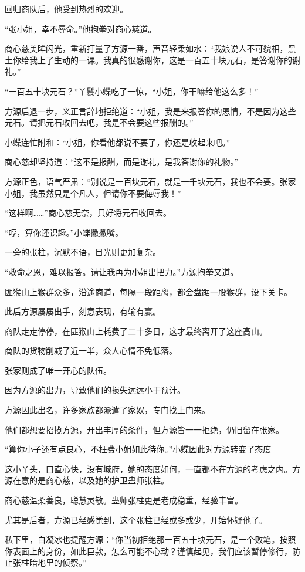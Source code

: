 \begin{this_body}
回归商队后，他受到热烈的欢迎。

“张小姐，幸不辱命。”他抱拳对商心慈道。

商心慈美眸闪光，重新打量了方源一番，声音轻柔如水：“我娘说人不可貌相，黑土你给我上了生动的一课。我真的很感谢你，这是一百五十块元石，是答谢你的谢礼。”

“一百五十块元石？”丫鬟小蝶吃了一惊，“小姐，你干嘛给他这么多！”

方源后退一步，义正言辞地拒绝道：“小姐，我是来报答你的恩情，不是因为这些元石。请把元石收回去吧，我是不会要这些报酬的。”

小蝶连忙附和：“小姐，你看他都说不要了，你还是收起来吧。”

商心慈却坚持道：“这不是报酬，而是谢礼，是我答谢你的礼物。”

方源正色，语气严肃：“别说是一百块元石，就是一千块元石，我也不会要。张家小姐，我虽然只是个凡人，但请你不要侮辱我！”

“这样啊……”商心慈无奈，只好将元石收回去。

“哼，算你还识趣。”小蝶撇撇嘴。

一旁的张柱，沉默不语，目光则更加复杂。

“救命之恩，难以报答。请让我再为小姐出把力。”方源抱拳又道。

匪猴山上猴群众多，沿途商道，每隔一段距离，都会盘踞一股猴群，设下关卡。

此后方源屡屡出手，刻意表现，有输有赢。

商队走走停停，在匪猴山上耗费了二十多日，这才最终离开了这座高山。

商队的货物削减了近一半，众人心情不免低落。

张家则成了唯一开心的队伍。

因为方源的出力，导致他们的损失远远小于预计。

方源因此出名，许多家族都派遣了家奴，专门找上门来。

他们都想要招揽方源，开出丰厚的条件，但方源皆一一拒绝，仍旧留在张家。

“算你小子还有点良心，不枉费小姐如此待你。”小蝶因此对方源转变了态度

这小丫头，口直心快，没有城府，她的态度如何，一直都不在方源的考虑之内。方源在意的是商心慈，以及她的护卫蛊师张柱。

商心慈温柔善良，聪慧灵敏。蛊师张柱更是老成稳重，经验丰富。

尤其是后者，方源已经感觉到，这个张柱已经或多或少，开始怀疑他了。

私下里，白凝冰也提醒方源：“你当初拒绝那一百五十块元石，是一个败笔。按照你表面上的身份，如此巨款，怎么可能不心动？谨慎起见，我们应该暂停修行，防止张柱暗地里的侦察。”


\end{this_body}
